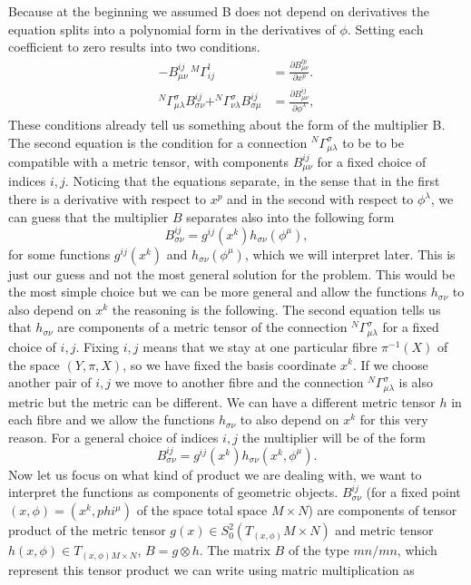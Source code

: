 \documentclass[english]{article}
\begin{document}
Because at the beginning we assumed B does not depend on derivatives the equation splits into a polynomial form in the derivatives of $\phi$. Setting each coefficient to zero results into two conditions.
\begin{align}
\label{HP21}
-B^{ij}_{\mu\nu}\,^M\Gamma^l_{ij}&=\frac{\partial B^{lp}_{\mu\nu}}{\partial x^p}.
\\
\label{HP22}
^N\Gamma^\sigma_{\mu\lambda}B^{ij}_{\sigma\nu}+^N\Gamma^\sigma_{\nu\lambda}B^{ij}_{\sigma\mu}&=\frac{\partial B^{ij}_{\mu\nu}}{\partial \phi^\lambda},
\end{align}
These conditions already tell us something about the form of the multiplier B. The second equation is the condition for a connection $^N\Gamma^\sigma_{\mu\lambda}$ to be to be compatible with a  metric tensor, with components $B^{ij}_{\mu\nu}$ for a fixed choice of indices $i,j$. Noticing that the equations separate, in the sense that in the first there is a derivative with respect to $x^p$ and in the second with respect to $\phi^\lambda$, we can guess that the multiplier $B$ separates also into the following form
$$
B^{ij}_{\sigma\nu}=g^{ij}(x^k)h_{\sigma\nu}(\phi^\mu),
$$
for some functions $g^{ij}(x^k)$ and $h_{\sigma\nu}(\phi^\mu)$, which we will interpret later. This is just our guess and not the most general solution for the problem.
This would be the most simple choice but we can be more general and allow the functions $h_{\sigma\nu}$ to also depend on $x^k$ the reasoning is the following. The second equation tells us that $h_{\sigma\nu}$ are components of a metric tensor of the connection $^N\Gamma^\sigma_{\mu\lambda}$ for a fixed choice of $i,j$. Fixing $i,j$ means that we stay at one particular fibre $\pi^{-1}(X)$ of the space $(Y,\pi,X)$, so we have fixed the basis coordinate $x^k$. If we choose another pair of $i,j$ we move to another fibre and the connection $^N\Gamma^\sigma_{\mu\lambda}$ is also metric but the metric can be different. We can have a different metric tensor $h$ in each fibre and we allow the functions $h_{\sigma\nu}$ to also depend on $x^k$ for this very reason. %
For a general choice of indices $i,j$ the multiplier will be of the form
$$
B^{ij}_{\sigma\nu}=g^{ij}(x^k)h_{\sigma\nu}(x^k,\phi^\mu).
$$
Now let us focus on what kind of product we are dealing with, we want to interpret the functions as components of geometric objects. $B^{ij}_{\sigma\nu}$ (for a fixed point  $(x,\phi)=(x^k,phi^\mu)$ of the space total space $M\times N$) are components of tensor product of the metric tensor $g(x)\in S^2_0(T_{(x,\phi)}M\times N)$ and metric tensor  $h(x,\phi)\in T_{(x,\phi)M\times N}$, $B=g\otimes h$. The matrix $B$ of the type  $mn/mn$, which represent this tensor product we can write using matric multiplication as 
\end{document}
